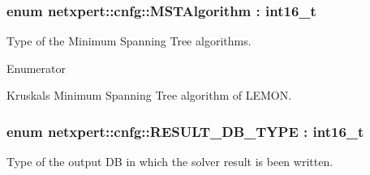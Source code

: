 \subsubsection[{\texorpdfstring{M\+S\+T\+Algorithm}{MSTAlgorithm}}]{\setlength{\rightskip}{0pt plus 5cm}enum {\bf netxpert\+::cnfg\+::\+M\+S\+T\+Algorithm} \+: int16\+\_\+t}\hypertarget{namespacenetxpert_1_1cnfg_ab77ff30f2da32945dbb19bdf6199f799}{}\label{namespacenetxpert_1_1cnfg_ab77ff30f2da32945dbb19bdf6199f799}


Type of the Minimum Spanning Tree algorithms. 

\begin{Desc}
\item[Enumerator]\par
\begin{description}
\item[{\em 
Kruskal\+\_\+\+L\+E\+M\+ON\hypertarget{namespacenetxpert_1_1cnfg_ab77ff30f2da32945dbb19bdf6199f799a548b8f5561ba6b0c0e77d67665e37c5a}{}\label{namespacenetxpert_1_1cnfg_ab77ff30f2da32945dbb19bdf6199f799a548b8f5561ba6b0c0e77d67665e37c5a}
}]Kruskal\textquotesingle{}s Minimum Spanning Tree algorithm of L\+E\+M\+ON. \end{description}
\end{Desc}
\subsubsection[{\texorpdfstring{R\+E\+S\+U\+L\+T\+\_\+\+D\+B\+\_\+\+T\+Y\+PE}{RESULT_DB_TYPE}}]{\setlength{\rightskip}{0pt plus 5cm}enum {\bf netxpert\+::cnfg\+::\+R\+E\+S\+U\+L\+T\+\_\+\+D\+B\+\_\+\+T\+Y\+PE} \+: int16\+\_\+t}\hypertarget{namespacenetxpert_1_1cnfg_a235b32f52360f5f331279b34e85064a5}{}\label{namespacenetxpert_1_1cnfg_a235b32f52360f5f331279b34e85064a5}


Type of the output DB in which the solver result is been written. 

